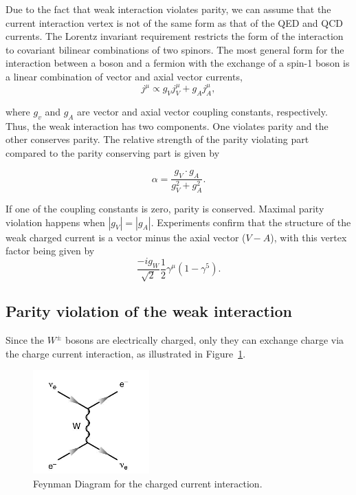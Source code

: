 \documentclass[10pt,swedish, openany]{book}
\begin{document}
Due to the fact that weak interaction violates parity, we can assume that the current interaction vertex is not of the same form as that of the QED and QCD currents. The Lorentz invariant requirement restricts the form of the interaction to covariant bilinear combinations of two spinors. The most general form for the interaction between a boson and a fermion with the exchange of a spin-1 boson is a linear combination of vector and axial vector currents, 
\begin{equation}
    j^{\mu} \propto g_V j^{\mu}_V + g_A j^{\mu}_A, 
\end{equation}

where $g_v$ and $g_A$ are vector and axial vector coupling constants, respectively. Thus, the weak interaction has two components. One violates parity and the other conserves parity. The relative strength of the parity violating part compared to the parity conserving part is given by

\begin{equation}
    \alpha = \frac{g_V \cdot g_A}{g^2_V + g^2_A}.
\end{equation}

If one of the coupling constants is zero, parity is conserved. Maximal parity violation happens when $|g_V|=|g_A|$. Experiments confirm that the structure of the weak charged current is a vector minus the axial vector ($V-A$), with this vertex factor being given by
\begin{equation}
    \frac{- i g_W}{\sqrt{2}}\frac{1}{2}\gamma^{\mu}(1-\gamma^5).
\end{equation}

\subsection{Parity violation of the weak interaction}

Since the $W^{\pm}$ bosons are electrically charged, only they can exchange charge via the charge current interaction, as illustrated in Figure~\ref{fig:WInteraction}.
  
\begin{figure}[h]
\includegraphics[scale=0.8]{charged.png}
\centering
\caption{Feynman Diagram for the charged current interaction.}
\label{fig:WInteraction}
\end{figure}  
  
\end{document}
